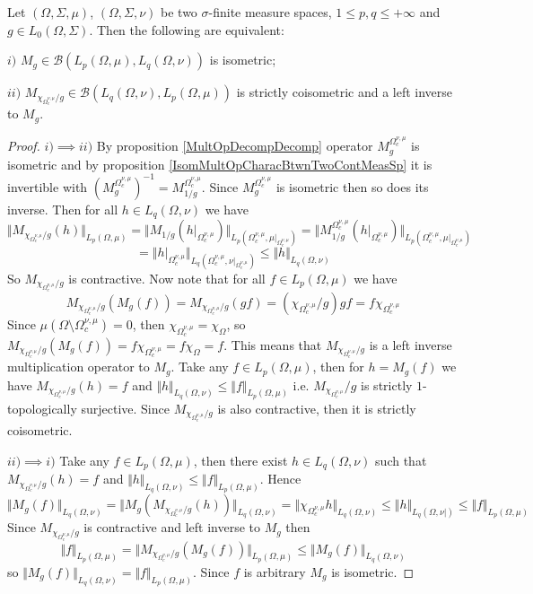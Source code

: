 \begin{proposition}\label{IsomMultOpDescBtwnTwoMeasSp} Let $(\Omega,\Sigma,\mu)$, $(\Omega,\Sigma,\nu)$ be two $\sigma$-finite measure spaces, $1\leq p,q\leq +\infty$ and $g\in L_0(\Omega,\Sigma)$. Then the following are equivalent:

$i)$ $M_g\in\mathcal{B}(L_p(\Omega,\mu),L_q(\Omega,\nu))$ is isometric;

$ii)$ $M_{\chi_{\Omega_c^{\nu,\mu}}/g}\in\mathcal{B}(L_q(\Omega,\nu), L_p(\Omega,\mu))$ is strictly coisometric and a left inverse to $M_g$.
\end{proposition}
\begin{proof}
$i)$$\implies$$ ii)$ By proposition \ref{MultOpDecompDecomp} operator $M_g^{\Omega_c^{\nu,\mu}}$ is isometric and by proposition \ref{IsomMultOpCharacBtwnTwoContMeasSp} it is invertible with $(M_g^{\Omega_c^{\nu,\mu}})^{-1}=M_{1/g}^{\Omega_c^{\nu,\mu}}$. Since $M_g^{\Omega_c^{\nu,\mu}}$ is isometric then so does its inverse. Then for all $h\in L_q(\Omega,\nu)$ we have
$$
\Vert M_{\chi_{\Omega_c^{\nu,\mu}}/g}(h)\Vert_{L_p(\Omega,\mu)}=
\Vert M_{1/g}(h|_{\Omega_c^{\nu,\mu}})\Vert_{L_p(\Omega_c^{\nu,\mu},\mu|_{\Omega_c^{\nu,\mu}})}=
\Vert M_{1/g}^{\Omega_c^{\nu,\mu}}(h|_{\Omega_c^{\nu,\mu}})\Vert_{L_p(\Omega_c^{\nu,\mu},\mu|_{\Omega_c^{\nu,\mu}})}
$$
$$
=\Vert h|_{\Omega_c^{\nu,\mu}}\Vert_{L_q(\Omega_c^{\nu,\mu},\nu|_{\Omega_c^{\nu,\mu}})}
\leq \Vert h \Vert_{L_q(\Omega,\nu)}
$$
So $M_{\chi_{\Omega_c^{\nu,\mu}}/g}$ is contractive. Now note that for all $f\in L_p(\Omega,\mu)$ we have 
$$
M_{\chi_{\Omega_c^{\nu,\mu}}/g}(M_g(f))
=M_{\chi_{\Omega_c^{\nu,\mu}}/g}(g  f)
=(\chi_{\Omega_c^{\nu,\mu}}/g)  g  f
=f \chi_{\Omega_c^{\nu,\mu}}
$$
Since $\mu(\Omega\setminus\Omega_c^{\nu,\mu})=0$, then $\chi_{\Omega_c^{\nu,\mu}}=\chi_{\Omega}$, so $M_{\chi_{\Omega_c^{\nu,\mu}}/g}(M_g(f))=f \chi_{\Omega_c^{\nu,\mu}}=f \chi_{\Omega}=f$. This means that $M_{\chi_{\Omega_c^{\nu,\mu}}/g}$ is a left inverse multiplication operator to $M_g$. Take any $f\in L_p(\Omega,\mu)$, then for $h=M_g(f)$ we have $M_{\chi_{\Omega_c^{\nu,\mu}}/g}(h)=f$ and $\Vert h\Vert_{L_q(\Omega,\nu)}\leq\Vert f\Vert_{L_p(\Omega,\mu)}$ i.e.  $M_{\chi_{\Omega_c^{\nu,\mu}}}/g$ is strictly $1$-topologically surjective. Since $M_{\chi_{\Omega_c^{\nu,\mu}}/g}$ is also contractive, then it is strictly coisometric.

$ii)$$\implies$$ i)$ Take any $f\in L_p(\Omega,\mu)$, then there exist $h\in L_q(\Omega,\nu)$ such that $M_{\chi_{\Omega_c^{\nu,\mu}}/g}(h)=f$ and $\Vert h\Vert_{L_q(\Omega,\nu)}\leq \Vert f\Vert_{L_p(\Omega,\mu)}$. Hence
$$
\Vert M_g(f)\Vert_{L_q(\Omega,\nu)}
=\Vert M_g(M_{\chi_{\Omega_c^{\nu,\mu}}/g}(h))\Vert_{L_q(\Omega,\nu)}
=\Vert \chi_{\Omega_c^{\nu,\mu}}h\Vert_{L_q(\Omega,\nu)}
\leq\Vert h\Vert_{L_q(\Omega,\nu|)}
\leq\Vert f\Vert_{L_p(\Omega,\mu)}
$$
Since $M_{\chi_{\Omega_c^{\nu,\mu}}/g}$ is contractive and left inverse to $M_g$ then
$$
\Vert f\Vert_{L_p(\Omega,\mu)}
=\Vert M_{\chi_{\Omega_c^{\nu,\mu}}/g}(M_g(f))\Vert_{L_p(\Omega,\mu)}
\leq\Vert M_g(f)\Vert_{L_q(\Omega,\nu)}
$$
so $\Vert M_g(f)\Vert_{L_q(\Omega,\nu)}=\Vert f\Vert_{L_p(\Omega,\mu)}$. Since $f$ is arbitrary $M_g$ is isometric.
\end{proof}

